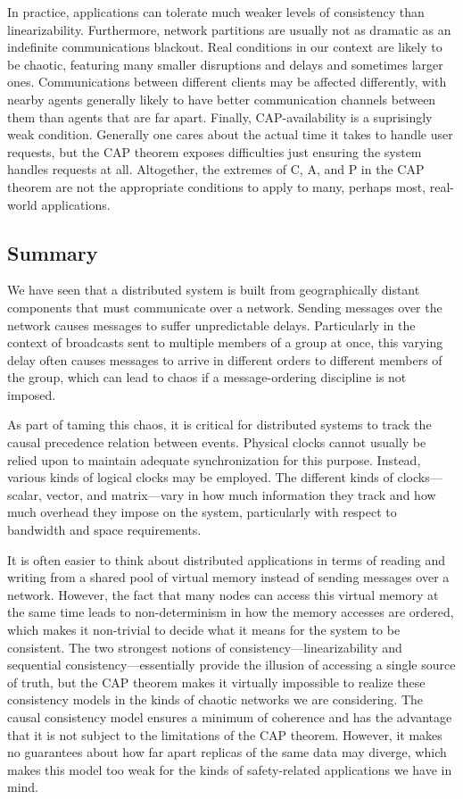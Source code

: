 \documentclass[]             %
{NASA}                       %
\theoremstyle{definition}
\begin{document}
In practice, applications can tolerate much weaker levels of consistency
than linearizability. Furthermore, network partitions are usually not as
dramatic as an indefinite communications blackout. Real conditions in
our context are likely to be chaotic, featuring many smaller disruptions
and delays and sometimes larger ones. Communications between different
clients may be affected differently, with nearby agents generally likely
to have better communication channels between them than agents that are
far apart. Finally, CAP-availability is a suprisingly weak condition.
Generally one cares about the actual time it takes to handle user
requests, but the CAP theorem exposes difficulties just ensuring the
system handles requests at all. Altogether, the extremes of C, A, and P
in the CAP theorem are not the appropriate conditions to apply to many,
perhaps most, real-world applications.


\subsection{Summary}
\label{sec:background-summary}

We have seen that a distributed system is built from geographically
distant components that must communicate over a network. Sending
messages over the network causes messages to suffer unpredictable
delays. Particularly in the context of broadcasts sent to multiple
members of a group at once, this varying delay often causes messages
to arrive in different orders to different members of the group, which
can lead to chaos if a message-ordering discipline is not imposed.

As part of taming this chaos, it is critical for distributed systems
to track the causal precedence relation between events. Physical
clocks cannot usually be relied upon to maintain adequate
synchronization for this purpose. Instead, various kinds of logical
clocks may be employed. The different kinds of clocks---scalar,
vector, and matrix---vary in how much information they track and how
much overhead they impose on the system, particularly with respect to
bandwidth and space requirements.

It is often easier to think about distributed applications in terms of
reading and writing from a shared pool of virtual memory instead of
sending messages over a network. However, the fact that many nodes can
access this virtual memory at the same time leads to non-determinism
in how the memory accesses are ordered, which makes it non-trivial to
decide what it means for the system to be consistent. The two
strongest notions of consistency---linearizability and sequential
consistency---essentially provide the illusion of accessing a single
source of truth, but the CAP theorem makes it virtually impossible to
realize these consistency models in the kinds of chaotic networks we
are considering. The causal consistency model ensures a minimum of
coherence and has the advantage that it is not subject to the
limitations of the CAP theorem. However, it makes no guarantees about
how far apart replicas of the same data may diverge, which makes this
model too weak for the kinds of safety-related applications we have in
mind.
\end{document}
